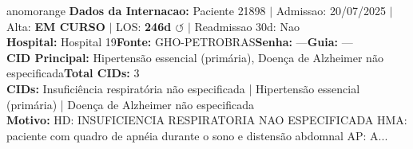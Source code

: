 \documentclass[a4paper,10pt]{article}
\begin{document}
\begin{anomalycard}[Internacao 140406 | GHO-PETROBRAS | ALTO (z=4.79)]{anomorange}
\textbf{Dados da Internacao:} Paciente 21898 $\mid$ Admissao: 20/07/2025 $\mid$ Alta: \textcolor{anomorange}{\textbf{EM CURSO}} $\mid$ LOS: \textbf{246d \textcolor{anomorange}{$\circlearrowleft$}} $\mid$ Readmissao 30d: Nao\\
\textbf{Hospital:} Hospital 19\quad\textbf{Fonte:} GHO-PETROBRAS\quad\textbf{Senha:} ---\quad\textbf{Guia:} ---\\
\textbf{CID Principal:} {\small Hipertensão essencial (primária), Doença de Alzheimer não especificada}\quad\textbf{Total CIDs:} 3\\

\textbf{CIDs:} {\scriptsize Insuficiência respiratória não especificada | Hipertensão essencial (primária) | Doença de Alzheimer não especificada}\\

\textbf{Motivo:} {\scriptsize HD: INSUFICIENCIA RESPIRATORIA NAO ESPECIFICADA  HMA: paciente com quadro de apnéia durante o sono e distensão abdomnal  AP: A...}\\


\end{anomalycard}
\end{document}
